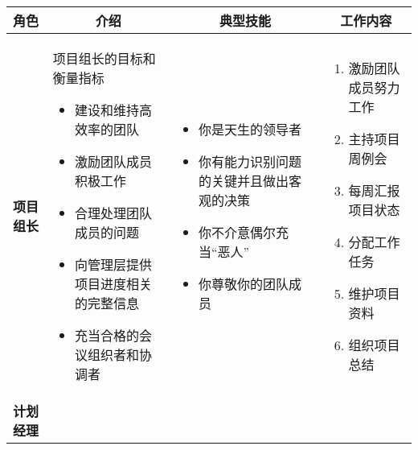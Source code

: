 \vspace{-0.5em}
\begin{spacing}{1.2}
    \centering
    \begin{longtable}{|m{1.5cm}<{\centering}|m{4.2cm}|m{4.2cm}|m{4.2cm}|}
        \hline
        \textbf{角色} & \multicolumn{1}{c|}{\textbf{介绍}} & \multicolumn{1}{c|}{\textbf{典型技能}} & \multicolumn{1}{c|}{\textbf{工作内容}} \\ \hline
        \textbf{项目组长} & 
        项目组长的目标和衡量指标
        \begin{itemize}[leftmargin=1.3em]
            \item 建设和维持高效率的团队
            \item 激励团队成员积极工作
            \item 合理处理团队成员的问题
            \item 向管理层提供项目进度相关的完整信息
            \item 充当合格的会议组织者和协调者
            \vspace{-1.3em}
        \end{itemize} &
        \vspace{-1.1em}
        \begin{itemize}[leftmargin=1.3em]
            \item 你是天生的领导者
            \item 你有能力识别问题的关键并且做出客观的决策
            \item 你不介意偶尔充当“恶人”
            \item 你尊敬你的团队成员
            \vspace{-1.3em}
        \end{itemize} &
        \vspace{-1.1em}
        \begin{enumerate}[label=\arabic*.,leftmargin=1.5em]
            \item 激励团队成员努力工作
            \item 主持项目周例会
            \item 每周汇报项目状态
            \item 分配工作任务
            \item 维护项目资料
            \item 组织项目总结
            \vspace{-1.3em}
        \end{enumerate} \\ \hline
        \textbf{计划经理} & 
        \vspace{-1.1em}

\end{longtable}
\end{spacing}
